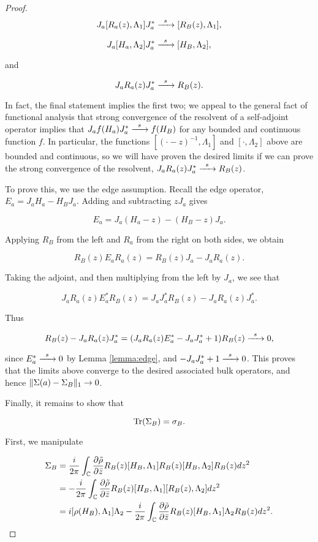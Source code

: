 \documentclass[12pt, letterpaper]{article}
\begin{document}
\begin{proof}
\[ J_a[R_a(z),\Lambda_1]J_a^* \xrightarrow{\enskip s \enskip} [R_B(z), \Lambda_1],\]

\[J_a [H_a,\Lambda_2]J_a^* \xrightarrow{\enskip s \enskip} [H_B, \Lambda_2],\]

and 

\[J_aR_a(z)J_a^* \xrightarrow{\enskip s \enskip} R_B(z).\]

In fact, the final statement implies the first two; we appeal to the general fact of functional analysis that strong convergence of the resolvent of a self-adjoint operator implies that $J_a f(H_a) J_a^* \xrightarrow{\enskip s \enskip} f(H_B)$ for any bounded and continuous function $f$. In particular, the functions $[(\cdot - z)^{-1}, \Lambda_1]$ and $[\cdot, \Lambda_2]$ above are bounded and continuous, so we will have proven the desired limits if we can prove the strong convergence of the resolvent, $J_aR_a(z)J_a^* \xrightarrow{\enskip s \enskip} R_B(z)$.

To prove this, we use the edge assumption. Recall the edge operator, $E_a = J_aH_a - H_BJ_a$. Adding and subtracting $zJ_a$ gives

\[E_a = J_a(H_a-z) - (H_B-z)J_a.\]

Applying $R_B$ from the left and $R_a$ from the right on both sides, we obtain 

\[R_B(z)E_aR_a(z) = R_B(z)J_a - J_aR_a(z).\]

Taking the adjoint, and then multiplying from the left by $J_a$, we see that 

\[J_aR_a(z)E_a^*R_B(z) = J_aJ_a^*R_B(z) - J_aR_a(z)J_a^*.\]

Thus

\[R_B(z) - J_aR_a(z)J_a^* = (J_aR_a(z)E_a^* - J_aJ_a^* + 1)R_B(z)  \xrightarrow{\enskip s \enskip} 0,\]

since $E^*_a \xrightarrow{\enskip s \enskip} 0$ by Lemma \ref{lemma:edge}, and $- J_aJ_a^* + 1 \xrightarrow{\enskip s \enskip}  0$. This proves that the limits above converge to the desired associated bulk operators, and hence $\lVert \Sigma(a) -  \Sigma_B \rVert_1 \to 0$.

Finally, it remains to show that  

\[\text{Tr}(\Sigma_B) = \sigma_B.\]

First, we manipulate

\[\begin{aligned}
\Sigma_B &= \frac{i}{2\pi}\int_{\mathbb{C}} \frac{\partial \tilde{\rho}}{\partial\bar{z}} R_B(z)[H_B,\Lambda_1]R_B(z)[H_B,\Lambda_2]R_B(z) dz^2\\
&= -\frac{i}{2\pi}\int_{\mathbb{C}} \frac{\partial \tilde{\rho}}{\partial\bar{z}} R_B(z)[H_B,\Lambda_1][R_B(z),\Lambda_2]dz^2\\
&= i[\rho(H_B),\Lambda_1]\Lambda_2 - \frac{i}{2\pi}\int_{\mathbb{C}} \frac{\partial \tilde{\rho}}{\partial\bar{z}} R_B(z)[H_B,\Lambda_1]\Lambda_2 R_B(z)dz^2.
\end{aligned}\]


\end{proof}
\end{document}

